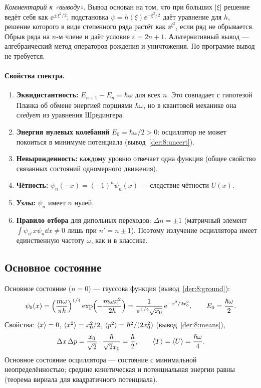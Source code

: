\emph{Комментарий к «выводу».} Вывод основан на том, что при больших $|\xi|$ решение ведёт себя как
$\ee^{\pm\xi^2/2}$; подстановка $\psi=h(\xi)\ee^{-\xi^2/2}$ даёт уравнение для $h$, решение которого
в виде степенного ряда растёт как $\ee^{\xi^2}$, если ряд не обрывается. Обрыв ряда на $n$-м члене
и даёт условие $\varepsilon=2n+1$. Альтернативный вывод — алгебраический метод
операторов рождения и уничтожения. По программе вывод не требуется.

\paragraph{Свойства спектра.}
\begin{enumerate}
 \item \textbf{Эквидистантность:} $E_{n+1}-E_n=\hbar\omega$ для всех $n$. Это совпадает с гипотезой
       Планка об обмене энергией порциями $\hbar\omega$, но в квантовой механике она \emph{следует} из
       уравнения Шредингера.
 \item \textbf{Энергия нулевых колебаний} $E_0=\hbar\omega/2>0$: осциллятор не может покоиться в минимуме
       потенциала (вывод~\ref{der:8:uncert}).
 \item \textbf{Невырожденность:} каждому уровню отвечает одна функция (общее свойство связанных
       состояний одномерного движения).
 \item \textbf{Чётность:} $\psi_n(-x)=(-1)^n\psi_n(x)$ — следствие чётности $U(x)$.
 \item \textbf{Узлы:} $\psi_n$ имеет $n$ нулей.
 \item \textbf{Правило отбора} для дипольных переходов: $\Delta n=\pm1$ (матричный элемент
       $\int\psi_{n'}x\psi_n\dd x\neq0$ лишь при $n'=n\pm1$). Поэтому излучение осциллятора имеет
       единственную частоту $\omega$, как и в классике.
\end{enumerate}

\subsection{Основное состояние}

Основное состояние ($n=0$) — гауссова функция (вывод~\ref{der:8:ground}):
\begin{equation}\label{eq:8:psi0}
  \psi_0(x)=\Bigl(\frac{m\omega}{\pi\hbar}\Bigr)^{1/4}\exp\Bigl(-\frac{m\omega x^2}{2\hbar}\Bigr)
  =\frac{1}{\pi^{1/4}\sqrt{x_0}}\,\mathrm{e}^{-x^2/2x_0^2},\qquad E_0=\frac{\hbar\omega}{2}.
\end{equation}
Свойства: $\langle x\rangle=0$, $\langle x^2\rangle=x_0^2/2$, $\langle p^2\rangle=\hbar^2/(2x_0^2)$ (вывод~\ref{der:8:means}),
\[
  \Delta x\,\Delta p=\frac{x_0}{\sqrt2}\cdot\frac{\hbar}{\sqrt2x_0}=\frac\hbar2,\qquad
  \langle T\rangle=\langle U\rangle=\frac{\hbar\omega}{4}.
\]
Основное состояние осциллятора — состояние с минимальной неопределённостью; средние кинетическая
и потенциальная энергии равны (теорема вириала для квадратичного потенциала).


